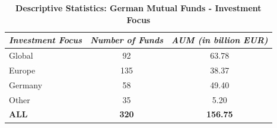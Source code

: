 {\centering
\begin{table}[!ht]
	\caption{\textbf{Descriptive Statistics: German Mutual Funds - Investment Focus} }
	\label{table_desc_stats_investment}
	\begin{center}
		\par
			{\small
				\begin{tabular}{lcc}
					\toprule
					\textit{Investment Focus} & \multicolumn{1}{c}{\textit{Number of Funds}} & \multicolumn{1}{c}{\textit{AUM (in billion EUR)}} \\
					\midrule
					Global & 92    & 63.78 \\
					Europe & 135   & 38.37 \\
					Germany & 58    & 49.40 \\
					Other & 35    & 5.20 \\
					\midrule
					\textbf{ALL} & \textbf{320} & \textbf{156.75} \\
					\bottomrule

				\end{tabular}
			}
	\end{center}
\end{table}
}




